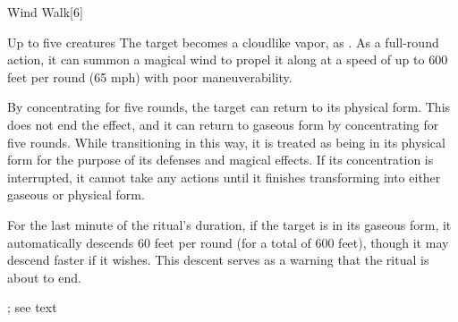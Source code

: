 \begin{spellsection}{Wind Walk}[6]
    \begin{spellheader}
    \end{spellheader}
    \begin{spellcontent}
        \begin{spelltargetinginfo}
        \end{spelltargetinginfo}
        \begin{spelleffects}
            \begin{spelltargets}{Up to five creatures}
                \spelleffect The target becomes a cloudlike vapor, as . As a full-round action, it can summon a magical wind to propel it along at a speed of up to 600 feet per round (65 mph) with poor maneuverability.

                By concentrating for five rounds, the target can return to its physical form. This does not end the effect, and it can return to gaseous form by concentrating for five rounds. While transitioning in this way, it is treated as being in its physical form for the purpose of its defenses and magical effects. If its concentration is interrupted, it cannot take any actions until it finishes transforming into either gaseous or physical form.

                For the last minute of the ritual's duration, if the target is in its gaseous form, it automatically descends 60 feet per round (for a total of 600 feet), though it may descend faster if it wishes. This descent serves as a warning that the ritual is about to end.
            \end{spelltargets}
            \spelldur \durext \dismissable; see text
        \end{spelleffects}
    \end{spellcontent}
    \begin{spellfooter}
    \end{spellfooter}
\end{spellsection}


